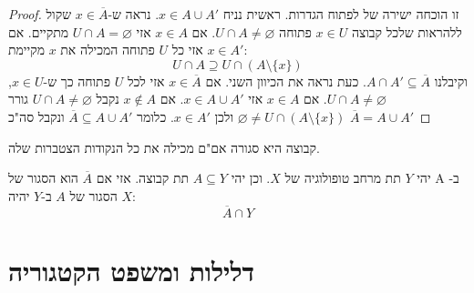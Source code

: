\documentclass{tstextbook}
\begin{document}
\begin{proof}
זו הוכחה ישירה של לפתוח הגדרות.
ראשית נניח \(x \in A\cup A'\). נראה ש-\(x \in \overline{A}\) שקול ללהראות שלכל קבוצה \(x \in U\) פתוחה \(U\cap A\neq \varnothing\).
אם \(x \in A\) אזי \(U\cap A = \varnothing\) מתקיים.
אם \(x \in A'\) אזי כל \(U\) פתוחה המכילה את \(x\) מקיימת:
$$U\cap  A \supseteq U\cap  (A\setminus  \{ x \})$$
וקיבלנו \(A\cap A'\subseteq \overline{A}\).
כעת נראה את הכיוון השני. אם \(x \in \overline{A}\) אזי לכל \(U\) פתוחה כך ש-\(x \in U\), \(U\cap A \neq \varnothing\).
אם \(x \in A\) אזי \(x \in A\cup A'\).
אם \(x \not\in A\) נקבל \(U\cap A \neq \varnothing\) גורר \(\varnothing \neq U \cap (A \setminus \{  x \})\) ולכן \(x \in A'\). כלומר \(\overline{A}\subseteq A\cup A'\) ונקבל סה"כ \(\overline{A}=A\cup A'\)

\end{proof}
\begin{corollary}
קבוצה היא סגורה אם"ם מכילה את כל הנקודות הצטברות שלה.

\end{corollary}
\begin{proposition}
יהי \(Y\) תת מרחב טופולוגיה של \(X\). וכן יהי \(A\subseteq Y\) תת קבוצה. אזי אם \(\overline{A}\) הוא הסגור של A ב-\(X\) הסגור של \(A\) ב-\(Y\) יהיה:
$$\overline{A} \cap  Y$$

\end{proposition}
\section{דלילות ומשפט הקטגוריה}
\end{document}
